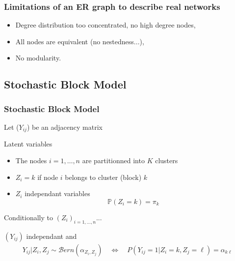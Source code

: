 \documentclass[compress,10pt]{beamer}
\begin{document}

\begin{frame}
 \frametitle{Limitations of an ER graph to describe real networks}
 
 
 
\begin{itemize}
 \item Degree distribution too concentrated, no high degree nodes,
 \item All nodes are equivalent (no nestedness...),
 \item No modularity.

 \end{itemize}

\end{frame}


\subsection[SBM]{Stochastic Block Model}

\begin{frame}  \frametitle{Stochastic Block Model}

\textcolor{blue}{\cite{nowickiSnijders2001}}
Let ($Y_{ij}$) be an adjacency matrix 

\begin{block}{Latent variables}
\begin{itemize}
\item The nodes $i= 1,\dots,n$ are partitionned into $K$ clusters
\item $Z_i = k$ if node $i$ belongs to cluster (block) $k$
\item $Z_i$ independant variables
$$ \mathbb{P}(Z_i = k) = \pi_k$$
\end{itemize}
\end{block}

\begin{block}{Conditionally to $(Z_i)_{i=1,\dots,n}$... }

$(Y_{ij})$ independant and 
\begin{eqnarray*}
 Y_{ij}  | Z_i, Z_j \sim  \mathcal{B}ern(\alpha_{Z_i,Z_j}) \quad \Leftrightarrow \quad  P(Y_{ij} = 1 | Z_i = k, Z_j = \ell)  =  \alpha_{k\ell}
\end{eqnarray*}
\end{block}
 


\end{frame}
\end{document}
